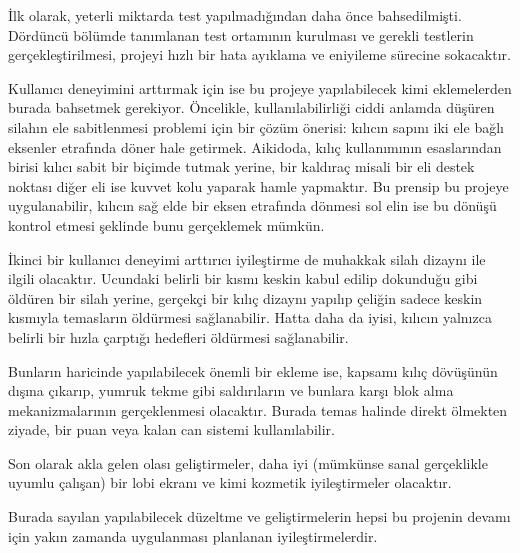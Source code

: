 \documentclass[a4paper, 12pt, titlepage]{article}
\begin{document}
İlk olarak, yeterli miktarda test yapılmadığından daha önce bahsedilmişti. Dördüncü bölümde
tanımlanan test ortamının kurulması ve gerekli testlerin gerçekleştirilmesi, projeyi hızlı bir hata
ayıklama ve eniyileme sürecine sokacaktır.

Kullanıcı deneyimini arttırmak için ise bu projeye yapılabilecek kimi eklemelerden burada bahsetmek
gerekiyor. Öncelikle, kullanılabilirliği ciddi anlamda düşüren silahın ele sabitlenmesi problemi
için bir çözüm önerisi: kılıcın sapını iki ele bağlı eksenler etrafında döner hale getirmek.
Aikidoda, kılıç kullanımının esaslarından birisi kılıcı sabit bir biçimde tutmak yerine, bir
kaldıraç misali bir eli destek noktası diğer eli ise kuvvet kolu yaparak hamle yapmaktır. Bu
prensip bu projeye uygulanabilir, kılıcın sağ elde bir eksen etrafında dönmesi sol elin ise bu
dönüşü kontrol etmesi şeklinde bunu gerçeklemek mümkün.

İkinci bir kullanıcı deneyimi arttırıcı iyileştirme de muhakkak silah dizaynı ile ilgili olacaktır.
Ucundaki belirli bir kısmı keskin kabul edilip dokunduğu gibi öldüren bir silah yerine, gerçekçi
bir kılıç dizaynı yapılıp çeliğin sadece keskin kısmıyla temasların öldürmesi sağlanabilir. Hatta
daha da iyisi, kılıcın yalnızca belirli bir hızla çarptığı hedefleri öldürmesi sağlanabilir.

Bunların haricinde yapılabilecek önemli bir ekleme ise, kapsamı kılıç dövüşünün dışına çıkarıp,
yumruk tekme gibi saldırıların ve bunlara karşı blok alma mekanizmalarının gerçeklenmesi olacaktır.
Burada temas halinde direkt ölmekten ziyade, bir puan veya kalan can sistemi kullanılabilir.

Son olarak akla gelen olası geliştirmeler, daha iyi (mümkünse sanal gerçeklikle uyumlu çalışan) bir
lobi ekranı ve kimi kozmetik iyileştirmeler olacaktır.

Burada sayılan yapılabilecek düzeltme ve geliştirmelerin hepsi bu projenin devamı için yakın
zamanda uygulanması planlanan iyileştirmelerdir.

\newpage

 
\end{document}

